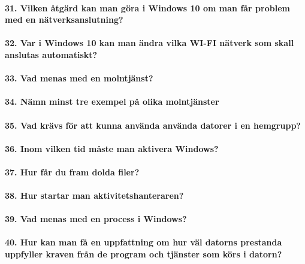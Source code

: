 \paragraph{31. Vilken åtgärd kan man göra i Windows 10 om man får problem med en nätverksanslutning?}

\paragraph{32. Var i Windows 10 kan man ändra vilka WI-FI nätverk som skall anslutas automatiskt?}

\paragraph{33. Vad menas med en molntjänst?}

\paragraph{34. Nämn minst tre exempel på olika molntjänster}

\paragraph{35. Vad krävs för att kunna använda använda datorer i en hemgrupp?}

\paragraph{36. Inom vilken tid måste man aktivera Windows?}

\paragraph{37. Hur får du fram dolda filer?}

\paragraph{38. Hur startar man aktivitetshanteraren?}

\paragraph{39. Vad menas med en process i Windows?}

\paragraph{40. Hur kan man få en uppfattning om hur väl datorns prestanda uppfyller kraven från de program och tjänster som körs i datorn?}

